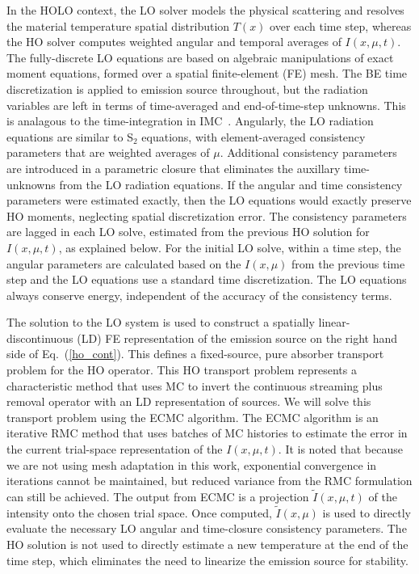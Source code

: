 \documentclass{anstrans}
\renewcommand{\eqref}[1]{(\ref{#1})}
\begin{document}
In the HOLO context, the LO solver models the physical scattering and
resolves the material temperature spatial distribution $T(x)$ over each time step, whereas
the HO solver computes weighted angular and temporal averages of $I(x,\mu,t)$.  The
fully-discrete LO equations are based on algebraic manipulations of exact moment equations,
formed over a spatial finite-element (FE)
mesh.  The BE time discretization is applied to emission source throughout, but the radiation
variables are left in terms of time-averaged and end-of-time-step unknowns.  This is analagous to
the time-integration in IMC~\cite{wollaber_review}.   Angularly, the LO
radiation equations are similar to S$_2$ equations,  with element-averaged
consistency parameters that are weighted averages of $\mu$.  Additional
consistency parameters are introduced in a parametric closure that eliminates the auxillary
time-unknowns from the LO radiation equations.
If the angular and time
consistency parameters were estimated exactly, then the LO equations would exactly preserve HO moments,
neglecting spatial discretization error.  The consistency parameters are lagged
in each LO solve, estimated from the previous HO solution for $I(x,\mu,t)$,
as explained below. For the initial LO solve, within a time step, the angular parameters
are calculated based on the $I(x,\mu)$ from the previous time step and the LO equations use a standard time discretization.  The LO equations always conserve energy,
independent of the accuracy of the consistency terms.

The solution to the LO system is used to construct a spatially linear-discontinuous (LD) FE representation of
the emission source on the right hand side of Eq.~\eqref{ho_cont}.  This defines a fixed-source, pure absorber
transport problem for the HO operator. This HO transport problem represents a characteristic method that uses MC to
invert the continuous streaming plus removal operator with an LD representation of
sources. We will solve this transport problem using the ECMC algorithm.  The ECMC
algorithm is an iterative RMC method that uses
batches of MC histories to estimate the error in the current trial-space representation of the
$I(x,\mu,t)$.  It is noted that because we are not using
mesh adaptation in this work, exponential convergence in iterations cannot be maintained,
but reduced variance from the RMC formulation can still be achieved.  The output from ECMC is a projection $\tilde I(x,\mu,t)$ of the intensity onto
the chosen trial space. Once computed, $\tilde{I}(x,\mu)$ is used to directly evaluate the
necessary LO angular and time-closure consistency parameters.   The HO solution is not used to directly estimate a new temperature at
the end of the time step, which eliminates the need to linearize the emission source for
stability.
\end{document}
